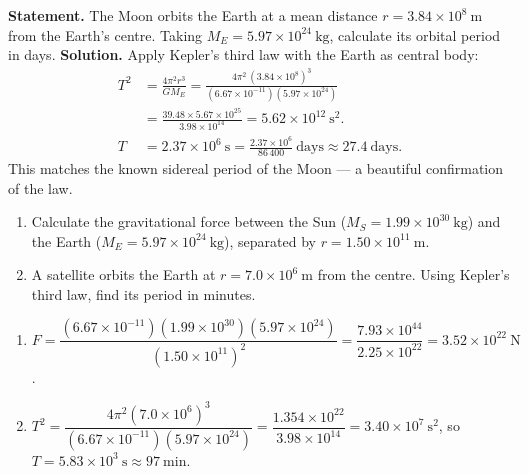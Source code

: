 \documentclass[11pt]{article}
\begin{document}
\begin{exoresolu}
\textbf{Statement.} The Moon orbits the Earth at a mean distance $r = 3.84\times 10^{8}\ \mathrm{m}$ from the Earth's centre. Taking $M_{E} = 5.97\times 10^{24}\ \mathrm{kg}$, calculate its orbital period in days.
\tcblower
\textbf{Solution.} Apply Kepler's third law with the Earth as central body:
\begin{align*}
T^{2} &= \frac{4\pi^{2} r^{3}}{G M_{E}}
      = \frac{4\pi^{2}\,(3.84\times 10^{8})^{3}}{(6.67\times 10^{-11})(5.97\times 10^{24})}\\
      &= \frac{39.48 \times 5.67\times 10^{25}}{3.98\times 10^{14}}
      = 5.62\times 10^{12}\ \mathrm{s^{2}}.\\
T &= 2.37\times 10^{6}\ \mathrm{s} = \frac{2.37\times 10^{6}}{86\,400}\ \text{days} \approx 27.4\ \text{days}.
\end{align*}
This matches the known sidereal period of the Moon --- a beautiful confirmation of the law.
\end{exoresolu}

\begin{exercice}
\begin{enumerate}
  \item Calculate the gravitational force between the Sun ($M_{S} = 1.99\times 10^{30}\ \mathrm{kg}$) and the Earth ($M_{E} = 5.97\times 10^{24}\ \mathrm{kg}$), separated by $r = 1.50\times 10^{11}\ \mathrm{m}$.
  \item A satellite orbits the Earth at $r = 7.0\times 10^{6}\ \mathrm{m}$ from the centre. Using Kepler's third law, find its period in minutes.
\end{enumerate}
\end{exercice}

\begin{corrige}[Exercise 1]
\begin{enumerate}
  \item $F = \dfrac{(6.67\times 10^{-11})(1.99\times 10^{30})(5.97\times 10^{24})}{(1.50\times 10^{11})^{2}} = \dfrac{7.93\times 10^{44}}{2.25\times 10^{22}} = 3.52\times 10^{22}\ \mathrm{N}$.
  \item $T^{2} = \dfrac{4\pi^{2}(7.0\times 10^{6})^{3}}{(6.67\times 10^{-11})(5.97\times 10^{24})} = \dfrac{1.354\times 10^{22}}{3.98\times 10^{14}} = 3.40\times 10^{7}\ \mathrm{s^{2}}$, so $T = 5.83\times 10^{3}\ \mathrm{s} \approx 97\ \mathrm{min}$.
\end{enumerate}
\end{corrige}
\end{document}
